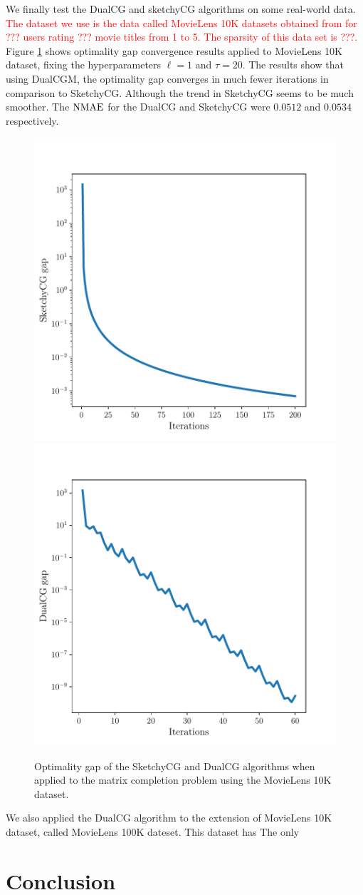 \documentclass[10pt, twocolumn, reqno, a4paper,oneside]{amsart}
\numberwithin{equation}{section}
\numberwithin{theorem}{section}
\numberwithin{figure}{section}
\numberwithin{table}{section}
\numberwithin{theorem}{section}
\numberwithin{equation}{section}
\begin{document}
We finally test the DualCG and sketchyCG algorithms on some real-world data.
\textcolor{red}{The dataset we use is the data called MovieLens 10K datasets obtained from \cite{10.1145/2827872} for ??? users rating ??? movie titles from 1 to 5.
	The sparsity of this data set is ???.}
Figure \ref{fig:Movielens10k} shows optimality gap convergence results applied to MovieLens 10K dataset, fixing the hyperparameters $\ell =1$ and $\tau = 20$. The results show that using DualCGM, the optimality gap converges in much fewer iterations in comparison to SketchyCG. Although the trend in SketchyCG seems to be much smoother. The $\rm NMAE$ for the DualCG and SketchyCG were $ 0.0512$ and $0.0534$ respectively.
\begin{figure}[!htb]
	\centering
	\includegraphics[width=0.40\linewidth]{figs/SketchyCGM-10k.pdf}
	\includegraphics[width=0.40\linewidth]{figs/DualCGM-10k.pdf}
	\caption{Optimality gap of the SketchyCG and DualCG algorithms when applied to the matrix completion problem using the MovieLens 10K dataset.}
	\label{fig:Movielens10k}
\end{figure}

We also applied the DualCG algorithm to the extension of MovieLens 10K dataset, called  MovieLens 100K dateset.
This dataset has
The only


\section{Conclusion} \label{ sec:conclusion }
\end{document}
